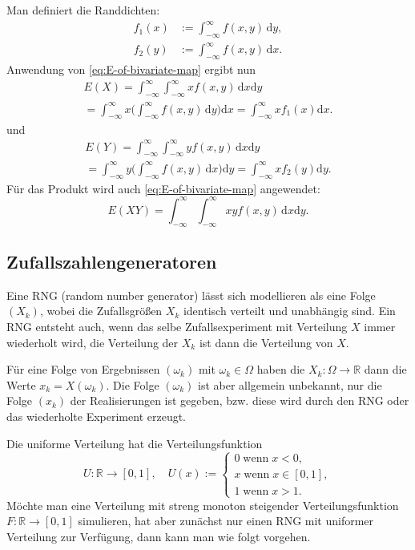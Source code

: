 \documentclass[a4paper,10pt,fleqn,twocolumn,twoside]{scrartcl}
\numberwithin{equation}{section}
\newcommand{\R}{\mathbb R}
\theoremstyle{rmbox}
\begin{document}
Man definiert die Randdichten:
\begin{align}
f_1(x) &:= \int_{-\infty}^\infty f(x,y)\,\mathrm dy,\\
f_2(y) &:= \int_{-\infty}^\infty f(x,y)\,\mathrm dx.
\end{align}
Anwendung von \eqref{eq:E-of-bivariate-map} ergibt nun
\begin{gather}
E(X) = \int_{-\infty}^\infty\int_{-\infty}^\infty xf(x,y)\,\mathrm dx\mathrm dy\\
= \int_{-\infty}^\infty x\bigg(\int_{-\infty}^\infty f(x,y)\,\mathrm dy\bigg)\mathrm dx
= \int_{-\infty}^\infty x f_1(x)\mathrm dx.
\end{gather}
und
\begin{gather}
E(Y) = \int_{-\infty}^\infty\int_{-\infty}^\infty yf(x,y)\,\mathrm dx\mathrm dy\\
= \int_{-\infty}^\infty y\bigg(\int_{-\infty}^\infty f(x,y)\,\mathrm dx\bigg)\mathrm dy
= \int_{-\infty}^\infty x f_2(y)\mathrm dy.
\end{gather}
Für das Produkt wird auch \eqref{eq:E-of-bivariate-map} angewendet:
\begin{equation}
E(XY) = \int_{-\infty}^\infty\int_{-\infty}^\infty
xyf(x,y)\,\mathrm dx\mathrm dy.
\end{equation}

\subsection{Zufallszahlengeneratoren}
Eine RNG (random number generator) lässt sich modellieren
als eine Folge $(X_k)$, wobei die Zufallsgrößen $X_k$
identisch verteilt und unabhängig sind. Ein RNG entsteht
auch, wenn das selbe Zufallsexperiment mit Verteilung $X$ immer
wiederholt wird, die Verteilung der $X_k$ ist dann die Verteilung
von $X$.

Für eine Folge von Ergebnissen $(\omega_k)$ mit
$\omega_k\in\Omega$ haben die $X_k\colon\Omega\to\R$ dann die Werte
$x_k=X(\omega_k)$. Die Folge $(\omega_k)$ ist aber allgemein
unbekannt, nur die Folge $(x_k)$ der Realisierungen ist gegeben,
bzw. diese wird durch den RNG oder das wiederholte Experiment
erzeugt.

Die uniforme Verteilung hat die Verteilungsfunktion%
\begin{equation}
U\colon\R\to [0,1],\quad U(x):=\begin{cases}
0\;\text{wenn}\; x<0,\\
x\;\text{wenn}\; x\in[0,1],\\
1\;\text{wenn}\; x>1.
\end{cases}
\end{equation}
Möchte man eine Verteilung mit streng monoton steigender
Verteilungsfunktion $F\colon\R\to[0,1]$ simulieren, hat aber zunächst
nur einen RNG mit uniformer Verteilung zur Verfügung, dann kann man
wie folgt vorgehen.
\end{document}
